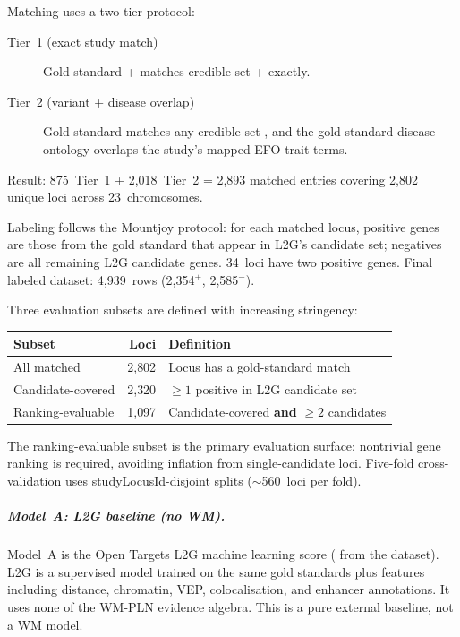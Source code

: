 \documentclass[11pt,openany]{report}
\begin{document}
Matching uses a two-tier protocol:
\begin{description}
\item[Tier~1 (exact study match)]
  Gold-standard  +  matches
  credible-set  +  exactly.
\item[Tier~2 (variant + disease overlap)]
  Gold-standard  matches any credible-set
  , and the gold-standard disease ontology
  overlaps the study's mapped EFO trait terms.
\end{description}
\noindent
Result: 875~Tier~1 + 2,018~Tier~2 = 2,893 matched entries
covering 2,802 unique loci across 23~chromosomes.

Labeling follows the Mountjoy protocol: for each matched locus,
positive genes are those from the gold standard that appear
in L2G's candidate set; negatives are all remaining L2G
candidate genes.  34~loci have two positive genes.
Final labeled dataset: 4,939~rows (2,354$^+$, 2,585$^-$).

Three evaluation subsets are defined with increasing stringency:
\begin{center}
\small
\begin{tabular}{@{}lrl@{}}
\toprule
\textbf{Subset} & \textbf{Loci} & \textbf{Definition} \\
\midrule
All matched         & 2{,}802 & Locus has a gold-standard match \\
Candidate-covered   & 2{,}320 & $\geq 1$ positive in L2G candidate set \\
Ranking-evaluable   & 1{,}097 & Candidate-covered \textbf{and} $\geq 2$ candidates \\
\bottomrule
\end{tabular}
\end{center}
\noindent
The ranking-evaluable subset is the primary evaluation surface:
nontrivial gene ranking is required, avoiding inflation from
single-candidate loci.  Five-fold cross-validation uses
studyLocusId-disjoint splits ($\sim$560~loci per fold).

\subparagraph{Model~A: L2G baseline (no WM).}
Model~A is the Open Targets L2G machine learning score
( from the  dataset).
L2G is a supervised model trained on the same gold standards
plus features including distance, chromatin, VEP, colocalisation,
and enhancer annotations.  It uses none of the WM-PLN evidence
algebra.  This is a pure external baseline, not a WM model.
\end{document}
